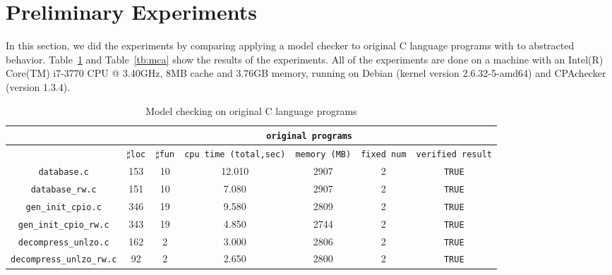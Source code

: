 \section{Preliminary Experiments}
\label{sec:experiment}
In this section, we did the experiments by comparing applying a model
checker to original C language programs with to abstracted
behavior. Table~\ref{tb:mcc} and Table~\ref{tb:mca} show the results
of the experiments. All of the experiments are done on a machine with
an Intel(R) Core(TM) i7-3770 CPU @ 3.40GHz, 8MB cache and 3.76GB
memory, running on Debian (kernel version 2.6.32-5-amd64) and
CPAchecker (version 1.3.4).

\begin{table}
  \scriptsize
\begin{tabular}{|c|c|c|c|c|c|c|}
\hline
& \multicolumn{6}{|c|}{\texttt{original programs}}  \\
\hline
 & $\sharp$\texttt{loc} & $\sharp$\texttt{fun} & \texttt{cpu time (total,sec)} & \texttt{memory (MB)} & \texttt{fixed num}& \texttt{verified result} \\
\hline
\texttt{database.c} & 153 & 10 & 12.010 & 2907 & 2  & \texttt{TRUE}  \\
\hline
\texttt{database\_rw.c} & 151 & 10 & 7.080 & 2907 & 2  & \texttt{TRUE}  \\
\hline
\texttt{gen\_init\_cpio.c} & 346 & 19 & 9.580 & 2809 & 2  & \texttt{TRUE}  \\
\hline
\texttt{gen\_init\_cpio\_rw.c} & 343 &19  & 4.850  & 2744  & 2  & \texttt{TRUE}  \\
\hline
\texttt{decompress\_unlzo.c} & 162 & 2  & 3.000  & 2806  & 2  & \texttt{TRUE}  \\
\hline
\texttt{decompress\_unlzo\_rw.c} & 92 & 2  & 2.650  & 2800  & 2  & \texttt{TRUE}  \\

\hline
\end{tabular}
\caption{Model checking on original C language programs}
\label{tb:mcc}
\end{table}

